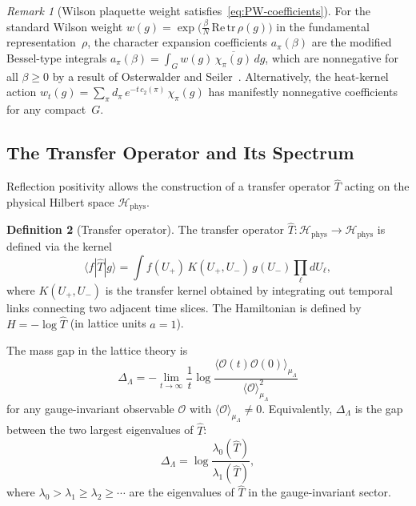 \documentclass[12pt,a4paper]{article}
\theoremstyle{definition}
\newtheorem{definition}{Definition}[section]
\theoremstyle{plain}
\theoremstyle{remark}
\newtheorem{remark}[definition]{Remark}
\begin{document}
\begin{remark}[Wilson plaquette weight satisfies~\eqref{eq:PW-coefficients}]
For the standard Wilson weight $w(g) = \exp\bigl(\frac{\beta}{N}\,\mathrm{Re}\,\mathrm{tr}\,\rho(g)\bigr)$ in the fundamental representation~$\rho$, the character expansion coefficients $a_\pi(\beta)$ are the modified Bessel-type integrals $a_\pi(\beta) = \int_G w(g)\,\overline{\chi_\pi(g)}\,dg$, which are nonnegative for all $\beta \geq 0$ by a result of Osterwalder and Seiler~\cite{OsterwalderSeiler1978}. Alternatively, the heat-kernel action $w_t(g) = \sum_\pi d_\pi\,e^{-t\,c_2(\pi)}\,\chi_\pi(g)$ has manifestly nonnegative coefficients for any compact~$G$.
\end{remark}

\subsection{The Transfer Operator and Its Spectrum}

Reflection positivity allows the construction of a transfer operator $\hat{T}$ acting on the physical Hilbert space $\mathcal{H}_{\mathrm{phys}}$.

\begin{definition}[Transfer operator]
\label{def:transfer-operator}
The transfer operator $\hat{T}: \mathcal{H}_{\mathrm{phys}} \to \mathcal{H}_{\mathrm{phys}}$ is defined via the kernel
\begin{equation}
    \langle f | \hat{T} | g \rangle = \int f(U_+)\, K(U_+, U_-)\, g(U_-) \prod_\ell dU_\ell,
\end{equation}
where $K(U_+, U_-)$ is the transfer kernel obtained by integrating out temporal links connecting two adjacent time slices. The Hamiltonian is defined by $H = -\log \hat{T}$ (in lattice units $a = 1$).
\end{definition}

The mass gap in the lattice theory is
\begin{equation}
    \Delta_\Lambda = -\lim_{t \to \infty} \frac{1}{t} \log \frac{\langle \mathcal{O}(t) \mathcal{O}(0) \rangle_{\mu_\Lambda}}{\langle \mathcal{O} \rangle_{\mu_\Lambda}^2}
\end{equation}
for any gauge-invariant observable $\mathcal{O}$ with $\langle \mathcal{O} \rangle_{\mu_\Lambda} \neq 0$. Equivalently, $\Delta_\Lambda$ is the gap between the two largest eigenvalues of $\hat{T}$:
\begin{equation}\label{eq:lattice-gap}
    \Delta_\Lambda = \log \frac{\lambda_0(\hat{T})}{\lambda_1(\hat{T})},
\end{equation}
where $\lambda_0 > \lambda_1 \geq \lambda_2 \geq \cdots$ are the eigenvalues of $\hat{T}$ in the gauge-invariant sector.
\end{document}
